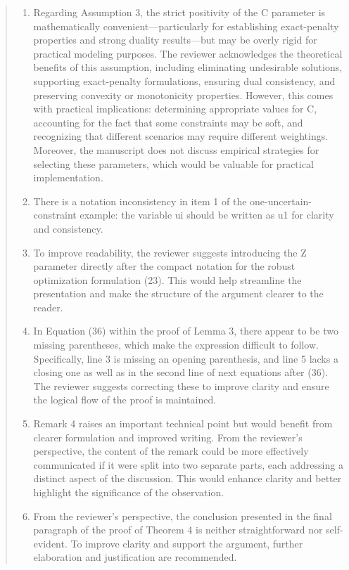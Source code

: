 \documentclass[journal,twoside,web]{ieeecolor}
\begin{document}
\begin{quote}
\begin{enumerate}
\item Regarding Assumption 3, the strict positivity of the C parameter is mathematically convenient—particularly for establishing exact-penalty properties and strong duality results—but may be overly rigid for practical modeling purposes. The reviewer acknowledges the theoretical benefits of this assumption, including eliminating undesirable solutions, supporting exact-penalty formulations, ensuring dual consistency, and preserving convexity or monotonicity properties. However, this comes with practical implications: determining appropriate values for C, accounting for the fact that some constraints may be soft, and recognizing that different scenarios may require different weightings. Moreover, the manuscript does not discuss empirical strategies for selecting these parameters, which would be valuable for practical implementation.

\item There is a notation inconsistency in item 1 of the one-uncertain-constraint example: the variable ui should be written as u1 for clarity and consistency.

\item To improve readability, the reviewer suggests introducing the Z parameter directly after the compact notation for the robust optimization formulation (23). This would help streamline the presentation and make the structure of the argument clearer to the reader.

\item In Equation (36) within the proof of Lemma 3, there appear to be two missing parentheses, which make the expression difficult to follow. Specifically, line 3 is missing an opening parenthesis, and line 5 lacks a closing one as well as in the second line of next equations after (36). The reviewer suggests correcting these to improve clarity and ensure the logical flow of the proof is maintained.

\item Remark 4 raises an important technical point but would benefit from clearer formulation and improved writing. From the reviewer's perspective, the content of the remark could be more effectively communicated if it were split into two separate parts, each addressing a distinct aspect of the discussion. This would enhance clarity and better highlight the significance of the observation.

\item From the reviewer's perspective, the conclusion presented in the final paragraph of the proof of Theorem 4 is neither straightforward nor self-evident. To improve clarity and support the argument, further elaboration and justification are recommended.


\end{enumerate}
\end{quote}
\end{document}
